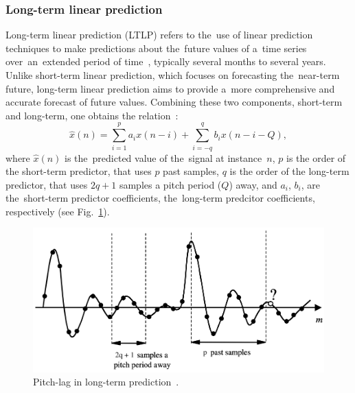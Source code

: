 \documentclass[12pt]{article}
\begin{document}
    \subsubsection{Long-term linear prediction} \label{ltlp}
    \noindent Long-term linear prediction (LTLP) refers to the~use of linear prediction techniques to make
    predictions about the~future values of a~time series over~an~extended period of time~\cite{WOS:000266982600001},
    typically several months to several years. Unlike short-term linear prediction, which focuses
    on forecasting the~near-term future, long-term linear prediction aims to provide a~more
    comprehensive and accurate forecast of future values. Combining these two components, short-term and long-term, one obtains the relation~\cite{vaidyanathan2007theory, WOS:A1990DY40800023}:
    \begin{equation}\label{eq10}
        \hat{x}(n) = \sum_{i=1}^{p} a_i x(n-i) + \sum_{i=-q}^{q} b_i x(n-i-Q),
    \end{equation}
    where $\hat{x}(n)$ is the~predicted value of the~signal at instance~$n$,
    $p$ is the order of the short-term predictor, that uses $p$ past samples, $q$
    is the order of the long-term predictor, that uses $2q+1$ samples a pitch period ($Q$) away,
    and $a_i$, $b_i$, are the~short-term predictor coefficients, the~long-term predcitor coefficients, respectively (see Fig.~\ref{fig1}).

    \begin{center}
        \begin{figure}[!ht]
            \centering
            \includegraphics[width=\columnwidth]{shift}
            \caption{Pitch-lag in long-term prediction~\cite{WOS:000266982600001}.}
            \label{fig1}
        \end{figure}
    \end{center}
    \newpage
\end{document}

